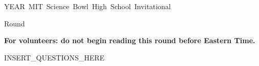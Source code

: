 \documentclass[12pt]{article}
\begin{document}
\begin{center}
  \begin{LARGE}
    {\selectfont
      \mbox{YEAR MIT Science Bowl High School Invitational}
      \vspace{10pt} \par Round \roundnumber
    }
  \end{LARGE}
\end{center}

\ifdefined\timewarning
  \begin{huge}
    \color{red}
    \textbf{For volunteers: do not begin reading this round before {\timewarning} Eastern Time.}
  \end{huge}
\fi

INSERT_QUESTIONS_HERE
\end{document}
